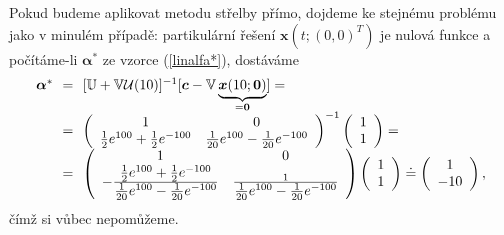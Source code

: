 \documentclass[a4paper, 12pt]{book}
\theoremstyle{definition}
\def\vc#1{\mathbf{\boldsymbol{#1}}}     %
\def\tn#1{{\mathbb{#1}}}    %
\begin{document}
Pokud budeme aplikovat metodu střelby přímo, dojdeme ke stejnému problému jako 
v minulém případě: partikulární řešení $\vc x(t;(0,0)^T)$ je nulová funkce a
počítáme-li $\vc\alpha^*$ ze vzorce (\ref{linalfa*}), dostáváme
\begin{displaymath}
\begin{array}{rcl}
\vc\alpha^* \!&\!=\!&\! [{\tn U}+{\tn V}{\cal U}(10)]^{-1}[\vc c-{\tn V}\underbrace{\vc x(10;\vc 0)}_{=\vc 0}]=\\
&\!=\!&\!\left(\begin{array}{cc}1 & 0 \\ \textstyle{\frac 12} e^{100}+\textstyle{\frac 12} e^{-100} & \textstyle{\frac 1{20}} e^{100}-\textstyle{\frac 1{20}} e^{-100}\end{array}\right)^{-1}
\left(\begin{array}{c}1 \\ 1\end{array}\right)=\\
&\!=\!&\!\left(\begin{array}{cc}1 & 0 \\ -\frac {\textstyle{\frac 12} e^{100}+\textstyle{\frac 12} e^{-100}}{\textstyle{\frac 1{20}} e^{100}-\textstyle{\frac 1{20}} e^{-100}} & \frac 1{\textstyle{\frac 1{20}} e^{100}-\textstyle{\frac 1{20}} e^{-100}}\end{array}\right)
\left(\begin{array}{c}1 \\ 1\end{array}\right)\doteq\left(\begin{array}{c}1 \\ -10\end{array}\right),
\end{array}
\end{displaymath}
čímž si vůbec nepomůžeme.
\end{document}
